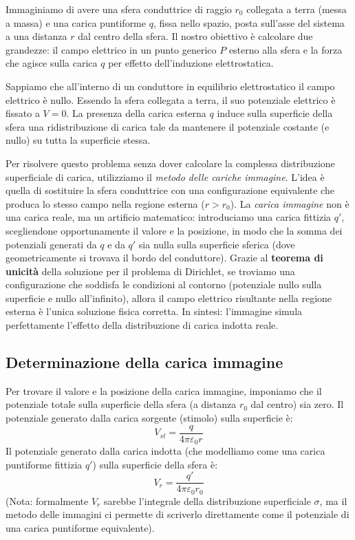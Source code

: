 \documentclass{book}
\begin{document}
Immaginiamo di avere una sfera conduttrice di raggio $r_0$ collegata a terra (messa a massa) e una carica puntiforme $q$, fissa nello spazio, posta sull'asse del sistema a una distanza $r$ dal centro della sfera. Il nostro obiettivo è calcolare due grandezze: il campo elettrico in un punto generico $P$ esterno alla sfera e la forza che agisce sulla carica $q$ per effetto dell'induzione elettrostatica.

Sappiamo che all'interno di un conduttore in equilibrio elettrostatico il campo elettrico è nullo. Essendo la sfera collegata a terra, il suo potenziale elettrico è fissato a $V=0$. La presenza della carica esterna $q$ induce sulla superficie della sfera una ridistribuzione di carica tale da mantenere il potenziale costante (e nullo) su tutta la superficie stessa.

Per risolvere questo problema senza dover calcolare la complessa distribuzione superficiale di carica, utilizziamo il \emph{metodo delle cariche immagine}. L'idea è quella di sostituire la sfera conduttrice con una configurazione equivalente che produca lo stesso campo nella regione esterna ($r > r_0$).
La \emph{carica immagine} non è una carica reale, ma un artificio matematico: introduciamo una carica fittizia $q'$, scegliendone opportunamente il valore e la posizione, in modo che la somma dei potenziali generati da $q$ e da $q'$ sia nulla sulla superficie sferica (dove geometricamente si trovava il bordo del conduttore).
Grazie al \textbf{teorema di unicità} della soluzione per il problema di Dirichlet, se troviamo una configurazione che soddisfa le condizioni al contorno (potenziale nullo sulla superficie e nullo all'infinito), allora il campo elettrico risultante nella regione esterna è l'unica soluzione fisica corretta. In sintesi: l'immagine simula perfettamente l'effetto della distribuzione di carica indotta reale.

\subsection*{Determinazione della carica immagine}

Per trovare il valore e la posizione della carica immagine, imponiamo che il potenziale totale sulla superficie della sfera (a distanza $r_0$ dal centro) sia zero.
Il potenziale generato dalla carica sorgente (stimolo) sulla superficie è:
$$
V_{st} = \frac{q}{4 \pi \varepsilon_0 r}
$$
Il potenziale generato dalla carica indotta (che modelliamo come una carica puntiforme fittizia $q'$) sulla superficie della sfera è:
$$
V_r = \frac{q'}{4 \pi \varepsilon_0 r_0}
$$
(Nota: formalmente $V_r$ sarebbe l'integrale della distribuzione superficiale $\sigma$, ma il metodo delle immagini ci permette di scriverlo direttamente come il potenziale di una carica puntiforme equivalente).
\end{document}
